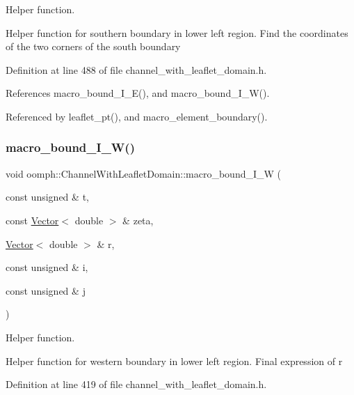 Helper function. 

Helper function for southern boundary in lower left region. Find the coordinates of the two corners of the south boundary 

Definition at line 488 of file channel\+\_\+with\+\_\+leaflet\+\_\+domain.\+h.



References macro\+\_\+bound\+\_\+\+I\+\_\+\+E(), and macro\+\_\+bound\+\_\+\+I\+\_\+\+W().



Referenced by leaflet\+\_\+pt(), and macro\+\_\+element\+\_\+boundary().

\mbox{\label{classoomph_1_1ChannelWithLeafletDomain_a15e43fe342a04c8466a43112e3a48ff3}} 
\subsubsection{\texorpdfstring{macro\+\_\+bound\+\_\+\+I\+\_\+\+W()}{macro\_bound\_I\_W()}}
{\footnotesize\ttfamily void oomph\+::\+Channel\+With\+Leaflet\+Domain\+::macro\+\_\+bound\+\_\+\+I\+\_\+W (\begin{DoxyParamCaption}\item[{const unsigned \&}]{t,  }\item[{const \hyperlink{classoomph_1_1Vector}{Vector}$<$ double $>$ \&}]{zeta,  }\item[{\hyperlink{classoomph_1_1Vector}{Vector}$<$ double $>$ \&}]{r,  }\item[{const unsigned \&}]{i,  }\item[{const unsigned \&}]{j }\end{DoxyParamCaption})\hspace{0.3cm}{\ttfamily [protected]}}



Helper function. 

Helper function for western boundary in lower left region. Final expression of r 

Definition at line 419 of file channel\+\_\+with\+\_\+leaflet\+\_\+domain.\+h.



